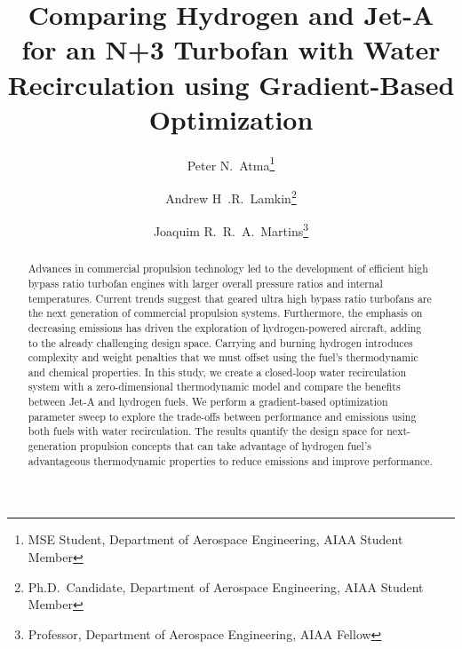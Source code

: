 \documentclass[conf]{new-aiaa}
\title{Comparing Hydrogen and Jet-A for an N+3 Turbofan with Water Recirculation using Gradient-Based Optimization} %
\author{Peter N.~Atma\footnote{MSE Student, Department of Aerospace Engineering, AIAA Student Member}}
\author{Andrew H~.R.~Lamkin\footnote{Ph.D.~Candidate, Department of Aerospace Engineering, AIAA Student Member}}
\author{Joaquim R.~R.~A.~Martins\footnote{Professor, Department of Aerospace Engineering, AIAA Fellow}}
\affil{University of Michigan, Ann Arbor, MI, 48109}
\begin{document}
\maketitle

\begin{abstract}
    Advances in commercial propulsion technology led to the development of efficient high bypass ratio turbofan engines with larger overall pressure ratios and internal temperatures.
    Current trends suggest that geared ultra high bypass ratio turbofans are the next generation of commercial propulsion systems.
    Furthermore, the emphasis on decreasing emissions has driven the exploration of hydrogen-powered aircraft, adding to the already challenging design space.
    Carrying and burning hydrogen introduces complexity and weight penalties that we must offset using the fuel's thermodynamic and chemical properties.
    In this study, we create a closed-loop water recirculation system with a zero-dimensional thermodynamic model and compare the benefits between Jet-A and hydrogen fuels.
    We perform a gradient-based optimization parameter sweep to explore the trade-offs between performance and emissions using both fuels with water recirculation.
    The results quantify the design space for next-generation propulsion concepts that can take advantage of hydrogen fuel's advantageous thermodynamic properties to reduce emissions and improve performance.
\end{abstract}
\end{document}
